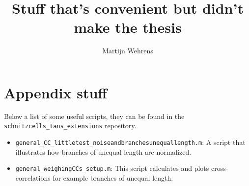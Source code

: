 \documentclass[]{report}
\begin{document}
	
\title{Stuff that's convenient but didn't make the thesis}
\author{Martijn Wehrens}	
	
\maketitle







%


\chapter*{Appendix stuff}

\begin{sloppypar}
    Below a list of some useful scripts, they can be found in the \nolinkurl{schnitzcells_tans_extensions} repository.
\end{sloppypar}

\begin{itemize}
    \item[]
    \nolinkurl{general_CC_littletest_noiseandbranchesunequallength.m}: 
    A script that illustrates how branches of unequal length are normalized.
    \item[]
    \nolinkurl{general_weighingCCs_setup.m}: 
    This script calculates and plots cross-correlations for example branches of unequal length.
\end{itemize}
\end{document}
